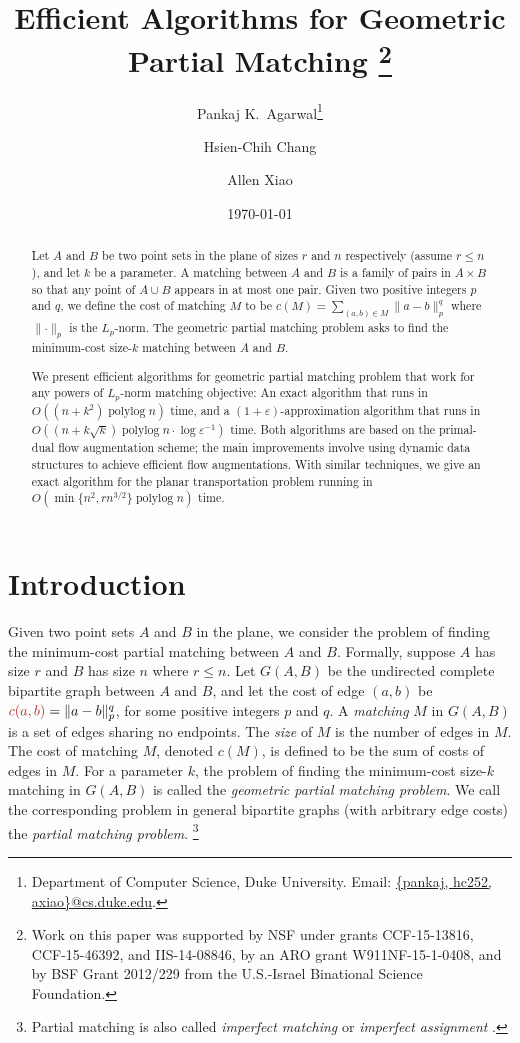 \documentclass[11pt,twoside]{article}
\title{Efficient Algorithms for Geometric Partial Matching%
\thanks{Work on this paper was supported by NSF under grants CCF-15-13816,
CCF-15-46392, and IIS-14-08846, by an ARO grant W911NF-15-1-0408, and by
BSF Grant 2012/229 from the U.S.-Israel Binational Science Foundation.}}
\author{
  Pankaj K.\ Agarwal\thanks{
  Department of Computer Science, Duke University. Email: \href{mailto:pankaj@cs.duke.edu,hc252@cs.duke.edu,axiao@cs.duke.edu}{\{pankaj, hc252, axiao\}@cs.duke.edu}.}
  \and
  Hsien-Chih Chang\footnotemark[2]
  \and
  Allen Xiao\footnotemark[2]
}
\date{\today}
\def\polylog{\mathop{\mathrm{polylog}}}
\def\eps{\varepsilon}
\def\norm#1{\mathopen\| #1 \mathclose\|}	%
\def\cost{c}
\theoremstyle{plain}
\numberwithin{figure}{section}
\def\EMPH#1{\textcolor{BrickRed}{{\emph{#1}}}}
\begin{document}
\maketitle

\begin{abstract}
Let $A$ and $B$ be two point sets in the plane of sizes $r$ and $n$ respectively (assume $r \leq n$), and let $k$ be a parameter.
A matching between $A$ and $B$ is a family of pairs in $A \times B$ so that any point of $A \cup B$ appears in at most one pair.
Given two positive integers $p$ and $q$, we define the cost of matching $M$ to be $\cost(M) = \sum_{(a, b) \in M}\norm{a-b}_p^q$ where $\norm{\cdot}_p$ is the $L_p$-norm.
The geometric partial matching problem asks to find the minimum-cost size-$k$ matching between $A$ and $B$.

We present efficient algorithms for geometric partial matching problem that work for any powers of $L_p$-norm matching objective:
An exact algorithm that runs in $O((n + k^2)\polylog n)$ time, and a $(1 + \eps)$-approximation algorithm that runs in $O((n + k\sqrt{k})\polylog n \cdot \log\eps^{-1})$ time.
Both algorithms are based on the primal-dual flow augmentation scheme; the main improvements involve using dynamic data structures to achieve efficient flow augmentations.
With similar techniques, we give an exact algorithm for the planar transportation problem running in $O(\min\{n^2, rn^{3/2}\}\polylog n)$ time.
\end{abstract}


\section{Introduction}

Given two point sets $A$ and $B$ in the plane, we consider the problem of finding
the minimum-cost partial matching between $A$ and $B$.
Formally, suppose $A$ has size $r$ and $B$ has size $n$ where $r \leq n$.
Let $G(A, B)$ be the undirected complete bipartite graph between
$A$ and $B$, and let the cost of edge $(a, b)$ be
$\EMPH{$c(a, b)$} = \norm{a-b}_p^q$, for some positive integers $p$ and $q$.
A \EMPH{matching} $M$ in $G(A, B)$ is a set of edges sharing no endpoints.
The \EMPH{size} of $M$ is the number of edges in $M$.
The cost of matching $M$, denoted \EMPH{$\cost(M)$}, is defined to be the sum of costs of edges in $M$.
For a parameter $k$, the problem of finding the minimum-cost
size-$k$ matching in $G(A, B)$ is called the \EMPH{geometric partial matching problem}.
We call the corresponding problem in general bipartite graphs (with arbitrary
edge costs) the \EMPH{partial matching problem}.%
\footnote{Partial matching is also called \EMPH{imperfect matching} or \EMPH{imperfect assignment} \cite{RT12,GHKT17}.}
\end{document}
